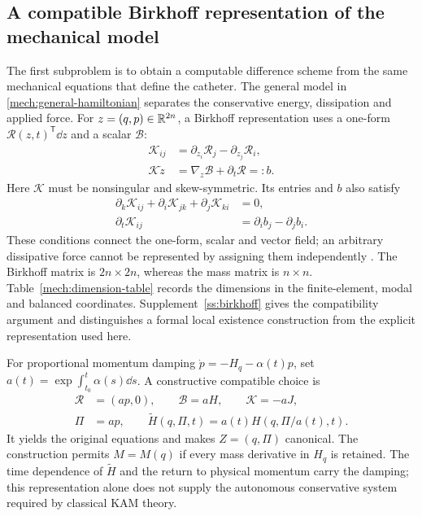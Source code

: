 \subsection{A compatible Birkhoff representation of the mechanical model}
\label{struct:birkhoff-section}

The first subproblem is to obtain a computable difference scheme from the same mechanical equations that define the catheter. The general model in \eqref{mech:general-hamiltonian} separates the conservative energy, dissipation and applied force. For $z=(q,p)\in\mathbb R^{2n}$, a Birkhoff representation uses a one-form $\mathcal R(z,t)^{\mathsf T}\dd z$ and a scalar $\mathcal B$:
\begin{equation}\label{struct:birkhoff}
\begin{aligned}
 \mathcal K_{ij}&=\partial_{z_i}\mathcal R_j-
                  \partial_{z_j}\mathcal R_i,\\
 \mathcal K\dot z&=\nabla_z\mathcal B+\partial_t\mathcal R=:b.
\end{aligned}
\end{equation}
Here $\mathcal K$ must be nonsingular and skew-symmetric. Its entries and $b$ also satisfy
\begin{equation}\label{struct:compatibility}
\begin{aligned}
 \partial_k\mathcal K_{ij}+\partial_i\mathcal K_{jk}
                +\partial_j\mathcal K_{ki}&=0,\\
 \partial_t\mathcal K_{ij}&=\partial_i b_j-\partial_j b_i.
\end{aligned}
\end{equation}
These conditions connect the one-form, scalar and vector field; an arbitrary dissipative force cannot be represented by assigning them independently \citep{su2007}. The Birkhoff matrix is $2n\times2n$, whereas the mass matrix is $n\times n$. Table~\ref{mech:dimension-table} records the dimensions in the finite-element, modal and balanced coordinates. Supplement~\ref{ss:birkhoff} gives the compatibility argument and distinguishes a formal local existence construction from the explicit representation used here.

For proportional momentum damping $\dot p=-H_q-\alpha(t)p$, set $a(t)=\exp\!\int_{t_0}^{t}\alpha(s)\dd s$. A constructive compatible choice is
\begin{equation}\label{struct:weighted-hamiltonian}
\begin{aligned}
 \mathcal R&=(a p,0),\qquad \mathcal B=aH,
       \qquad\mathcal K=-aJ,\\
 \Pi&=a p,\qquad
 \widetilde H(q,\Pi,t)=a(t)H(q,\Pi/a(t),t).
\end{aligned}
\end{equation}
It yields the original equations and makes $Z=(q,\Pi)$ canonical. The construction permits $M=M(q)$ if every mass derivative in $H_q$ is retained. The time dependence of $\widetilde H$ and the return to physical momentum carry the damping; this representation alone does not supply the autonomous conservative system required by classical KAM theory.

